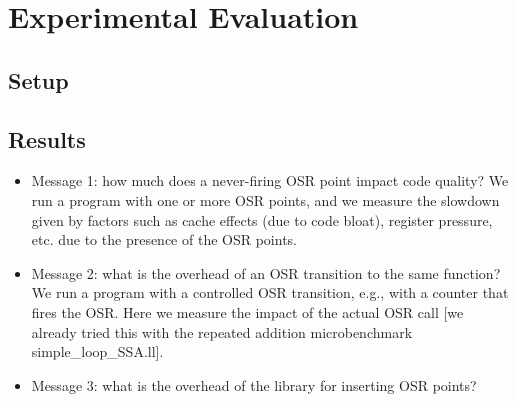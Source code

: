 \section{Experimental Evaluation}
\label{se:experiments}

\subsection{Setup}

\subsection{Results}

\begin{itemize}
\item Message 1: how much does a never-firing OSR point impact code quality? We run a program with one or more OSR points, and we measure the slowdown given by factors such as cache effects (due to code bloat), register pressure, etc. due to the presence of the OSR points.
\item Message 2: what is the overhead of an OSR transition to the same function? We run a program with a controlled OSR transition, e.g., with a counter that fires the OSR. Here we measure the impact of the actual OSR call [we already tried this with the repeated addition microbenchmark simple_loop_SSA.ll].
\item Message 3: what is the overhead of the library for inserting OSR points?
\end{itemize}


